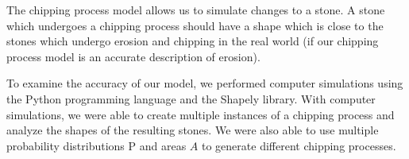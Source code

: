 The chipping process model allows us to simulate changes to a stone. A stone which undergoes a chipping process should have a shape which is close to the stones which undergo erosion and chipping in the real world (if our chipping process model is an accurate description of erosion).

To examine the accuracy of our model, we performed computer simulations using the Python programming language and the Shapely library. With computer simulations, we were able to create multiple instances of a chipping process and analyze the shapes of the resulting stones. We were also able to use multiple probability distributions $\mathrm{P}$ and areas $A$ to generate different chipping processes.




